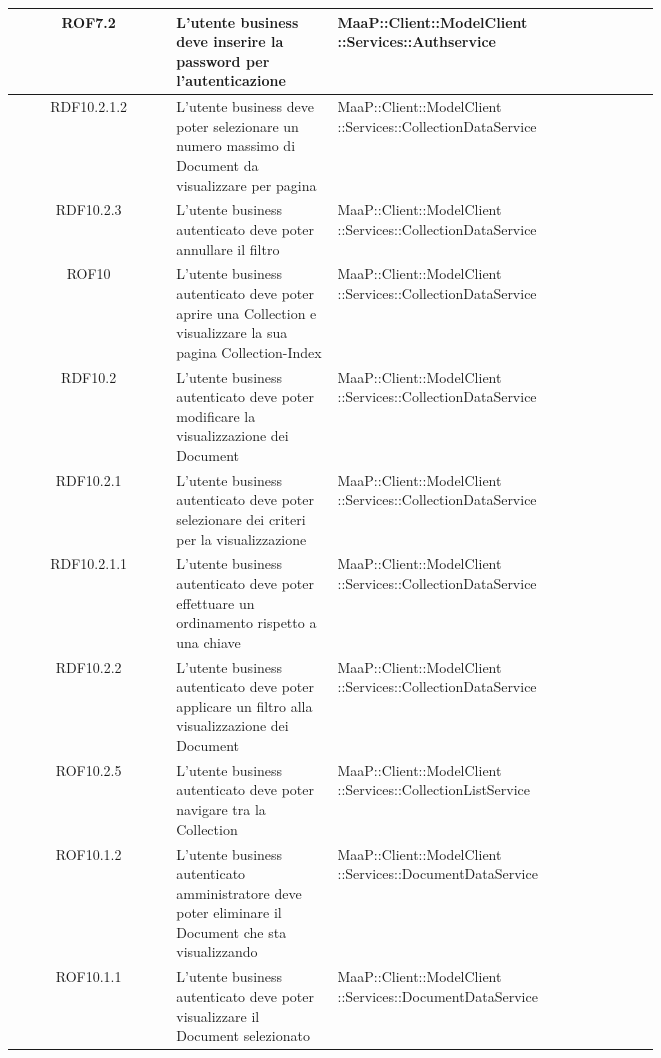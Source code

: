 \begin{center}
\begin{longtable}{|c|p{0.25\linewidth}|p{0.5\linewidth}|}
\midrule
ROF7.2
& L'utente business deve inserire la password per l'autenticazione
& MaaP::Client::ModelClient ::Services::Authservice\\

\midrule
RDF10.2.1.2
& L'utente business deve poter selezionare un numero massimo di Document da visualizzare per pagina
& MaaP::Client::ModelClient ::Services::CollectionDataService\\

\midrule
RDF10.2.3
& L'utente business autenticato deve poter annullare il filtro
& MaaP::Client::ModelClient ::Services::CollectionDataService\\

\midrule
ROF10
& L'utente business autenticato deve poter aprire una Collection e visualizzare la sua pagina Collection-Index
& MaaP::Client::ModelClient ::Services::CollectionDataService\\

\midrule
RDF10.2
& L'utente business autenticato deve poter modificare la visualizzazione dei Document
& MaaP::Client::ModelClient ::Services::CollectionDataService\\

\midrule
RDF10.2.1
& L'utente business autenticato deve poter selezionare dei criteri per la visualizzazione
& MaaP::Client::ModelClient ::Services::CollectionDataService\\

\midrule
RDF10.2.1.1
& L'utente business autenticato deve poter effettuare un ordinamento rispetto a una chiave
& MaaP::Client::ModelClient ::Services::CollectionDataService\\

\midrule
RDF10.2.2
& L'utente business autenticato deve poter applicare un filtro alla visualizzazione dei Document
& MaaP::Client::ModelClient ::Services::CollectionDataService\\

\midrule
ROF10.2.5
& L'utente business autenticato deve poter navigare tra la Collection
& MaaP::Client::ModelClient ::Services::CollectionListService\\

\midrule
ROF10.1.2
& L'utente business autenticato amministratore deve poter eliminare il Document che sta visualizzando
& MaaP::Client::ModelClient ::Services::DocumentDataService\\

\midrule
ROF10.1.1
& L'utente business autenticato deve poter visualizzare il Document selezionato
& MaaP::Client::ModelClient ::Services::DocumentDataService\\


\end{longtable}
\end{center}
